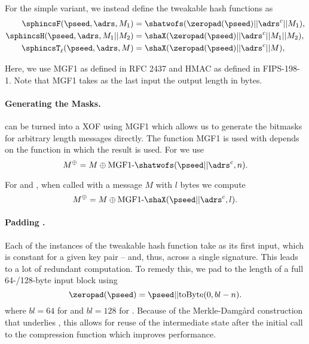   For the simple variant, we instead define the tweakable hash functions as
   \begin{equation}
   \begin{aligned}
      \sphincsF(\pseed, \adrs, M_1) &= \shatwofs(\zeropad(\pseed) || \adrs^{c} || M_1),\\
      \sphincsH(\pseed, \adrs, M_1 || M_2) &= \shaX(\zeropad(\pseed) || \adrs^{c} || M_1 || M_2),\\
      \sphincsT_\ell(\pseed, \adrs, M) &= \shaX(\zeropad(\pseed) || \adrs^{c} || M),\\
   \end{aligned}
   \end{equation}

   Here, we use MGF1 as defined in RFC 2437 and HMAC as defined in FIPS-198-1. 
   Note that MGF1 takes as the last input the output length in bytes.
   \paragraph{Generating the Masks.} \shatwo can be turned into a XOF using MGF1
   which allows us to generate the bitmasks for arbitrary length messages directly. The function MGF1 is used with depends on the function in which the result is used. For \sphincsF we use 
   \begin{equation*}
      M^{\oplus} = M \oplus \text{MGF1-}\shatwofs(\pseed || \adrs^{c}, n).
   \end{equation*}

   For \sphincsH and \sphincsT, when called with a message $M$ with $l$ bytes we compute
   \begin{equation*}
      M^{\oplus} = M \oplus \text{MGF1-}\shaX(\pseed || \adrs^{c}, l).
   \end{equation*}

   \paragraph{Padding \pseed.} Each of the instances of the tweakable hash function take \pseed as its first input, which is constant for a given key pair -- and, thus, across a single signature.
   This leads to a lot of redundant computation. To remedy this, we pad \pseed to the length of a full 64-/128-byte \shatwo input block using
  \begin{equation*}
      \zeropad(\pseed) = \pseed || \text{toByte}(0, bl - n).
   \end{equation*}
   where $bl= 64$ for \shatwofs and $bl = 128$ for \shatwofivetwelve.
   Because of the Merkle-Damg\aa{}rd construction that underlies \shatwo, this allows for reuse of the intermediate \shatwo state after the initial call to the compression function 
   which improves performance.

